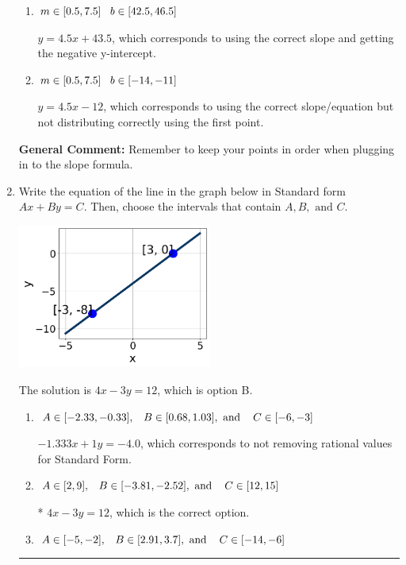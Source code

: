 \documentclass{extbook}[14pt]
\newcommand{\litem}[1]{\item #1

\rule{\textwidth}{0.4pt}}
\begin{document}
\begin{enumerate}
{\begin{enumerate}[label=\Alph*.]
* $y = 4.5x -43.5$, which is the correct option.
\item \( m \in [0.5, 7.5] \hspace*{3mm} b \in [42.5, 46.5] \)

 $y = 4.5x + 43.5$, which corresponds to using the correct slope and getting the negative y-intercept.
\item \( m \in [0.5, 7.5] \hspace*{3mm} b \in [-14, -11] \)

 $y = 4.5x -12$, which corresponds to using the correct slope/equation but not distributing correctly using the first point.
\end{enumerate}

\textbf{General Comment:} Remember to keep your points in order when plugging in to the slope formula.
}
\litem{
Write the equation of the line in the graph below in Standard form $Ax+By=C$. Then, choose the intervals that contain $A, B, \text{ and } C$.

\begin{center}
    \includegraphics[width=0.5\textwidth]{../Figures/linearGraphToStandardB.png}
\end{center}




The solution is \( 4x - 3y = 12 \), which is option B.\begin{enumerate}[label=\Alph*.]
\item \( A \in [-2.33, -0.33], \hspace{3mm} B \in [0.68, 1.03], \text{ and } \hspace{3mm} C \in [-6, -3] \)

 $-1.333x + 1y = -4.0$, which corresponds to not removing rational values for Standard Form.
\item \( A \in [2, 9], \hspace{3mm} B \in [-3.81, -2.52], \text{ and } \hspace{3mm} C \in [12, 15] \)

* $4x - 3y = 12$, which is the correct option.
\item \( A \in [-5, -2], \hspace{3mm} B \in [2.91, 3.7], \text{ and } \hspace{3mm} C \in [-14, -6] \)


\end{enumerate}}
\end{enumerate}
\end{document}
